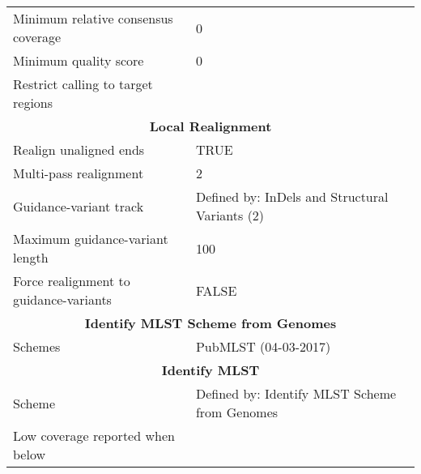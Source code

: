 \begin{scriptsize}
\begin{center}
\begin{longtable}{ll}
Minimum relative consensus coverage          & 0                                              \\
Minimum quality score                        & 0                                              \\
Restrict calling to target regions           &                                                \\
\midrule
\multicolumn{2}{c}{\textbf{Local Realignment}}                                                           \\\midrule
Realign unaligned ends                       & TRUE                                           \\
Multi-pass realignment                       & 2                                              \\
Guidance-variant track                       & Defined by: InDels and Structural Variants (2) \\
Maximum guidance-variant length              & 100                                            \\
Force realignment to guidance-variants       & FALSE                                          \\
\midrule
\multicolumn{2}{c}{\textbf{Identify MLST Scheme from Genomes}}                                         \\\midrule
Schemes                                      & PubMLST (04-03-2017)                           \\
\midrule
\multicolumn{2}{c}{\textbf{Identify MLST}}                                         \\\midrule
Scheme                                       & Defined by: Identify MLST Scheme from Genomes  \\
Low coverage reported when below             &                                               
\end{longtable}

\end{center}
\end{scriptsize}